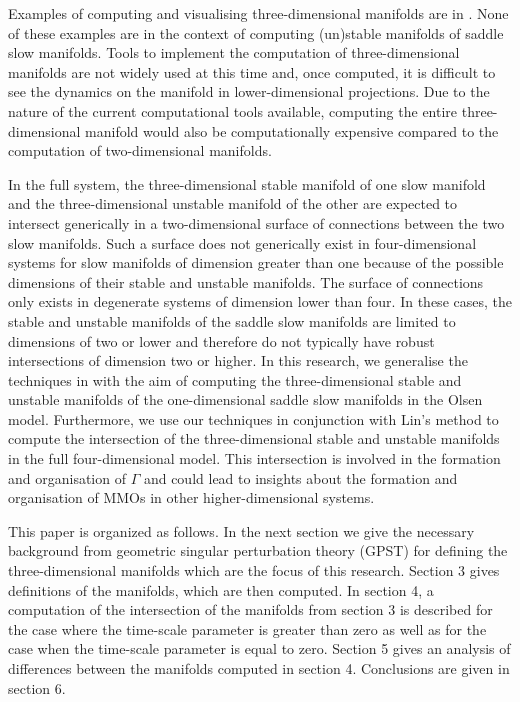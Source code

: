 \documentclass{ws-ijbc}
\begin{document}
Examples of computing and visualising three-dimensional manifolds are in \cite{Cris_paper, Initial_conditions_volume, Invariant_tori_again, Invariant_tori}.  None of these examples are in the context of computing (un)stable manifolds of saddle slow manifolds.  Tools to implement the computation of three-dimensional manifolds are not widely used at this time and, once computed, it is difficult to see the dynamics on the manifold in lower-dimensional projections.  Due to the nature of the current computational tools available, computing the entire three-dimensional manifold would also be computationally expensive compared to the computation of two-dimensional manifolds.

In the full system, the three-dimensional stable manifold of one slow manifold and the three-dimensional unstable manifold of the other are expected to intersect generically in a two-dimensional surface of connections between the two slow manifolds.  Such a surface does not generically exist in four-dimensional systems for slow manifolds of dimension greater than one because of the possible dimensions of their stable and unstable manifolds.  The surface of connections only exists in degenerate systems of dimension lower than four.  In these cases, the stable and unstable manifolds of the saddle slow manifolds are limited to dimensions of two or lower and therefore do not typically have robust intersections of dimension two or higher.  In this research, we generalise the techniques in \cite{Saeed_Paper, Cris_paper} with the aim of computing the three-dimensional stable and unstable manifolds of the one-dimensional saddle slow manifolds in the Olsen model.  Furthermore, we use our techniques in conjunction with Lin's method to compute the intersection of the three-dimensional stable and unstable manifolds in the full four-dimensional model.  This intersection is involved in the formation and organisation of $\Gamma$ and could lead to insights about the formation and organisation of MMOs in other higher-dimensional systems.

This paper is organized as follows.  In the next section we give the necessary background from geometric singular perturbation theory (GPST) for defining the three-dimensional manifolds which are the focus of this research.  Section 3 gives definitions of the manifolds, which are then computed.  In section 4, a computation of the intersection of the manifolds from section 3 is described for the case where the time-scale parameter is greater than zero as well as for the case when the time-scale parameter is equal to zero.  Section 5 gives an analysis of differences between the manifolds computed in section 4.  Conclusions are given in section 6.
\end{document}
